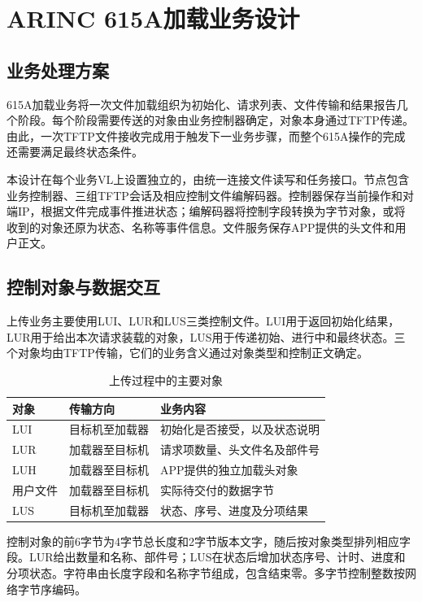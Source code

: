 \chapter{ARINC 615A加载业务设计}
\section{业务处理方案}
615A加载业务将一次文件加载组织为初始化、请求列表、文件传输和结果报告几个阶段。每个阶段需要传送的对象由业务控制器确定，对象本身通过TFTP传递。由此，一次TFTP文件接收完成用于触发下一业务步骤，而整个615A操作的完成还需要满足最终状态条件。

本设计在每个业务VL上设置独立的，由统一连接文件读写和任务接口。节点包含业务控制器、三组TFTP会话及相应控制文件编解码器。控制器保存当前操作和对端IP，根据文件完成事件推进状态；编解码器将控制字段转换为字节对象，或将收到的对象还原为状态、名称等事件信息。文件服务保存APP提供的头文件和用户正文。

\section{控制对象与数据交互}
上传业务主要使用LUI、LUR和LUS三类控制文件。LUI用于返回初始化结果，LUR用于给出本次请求装载的对象，LUS用于传递初始、进行中和最终状态。三个对象均由TFTP传输，它们的业务含义通过对象类型和控制正文确定。

\begin{table}[htbp]\centering\small
\caption{上传过程中的主要对象}
\begin{tabularx}{\linewidth}{@{}l l Y@{}}\toprule 对象 & 传输方向 & 业务内容\\\midrule
LUI & 目标机至加载器 & 初始化是否接受，以及状态说明\\
LUR & 加载器至目标机 & 请求项数量、头文件名及部件号\\
LUH & 加载器至目标机 & APP提供的独立加载头对象\\
用户文件 & 加载器至目标机 & 实际待交付的数据字节\\
LUS & 目标机至加载器 & 状态、序号、进度及分项结果\\\bottomrule
\end{tabularx}\end{table}

控制对象的前6字节为4字节总长度和2字节版本文字，随后按对象类型排列相应字段。LUR给出数量和名称、部件号；LUS在状态后增加状态序号、计时、进度和分项状态。字符串由长度字段和名称字节组成，包含结束零。多字节控制整数按网络字节序编码。

